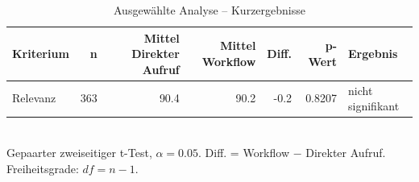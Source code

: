 \begin{table}[htbp]
\centering
\caption{Ausgewählte Analyse -- Kurzergebnisse}
\begin{tabular}{lrrrrrl}
\toprule
Kriterium & n & Mittel Direkter Aufruf & Mittel Workflow & Diff. & p-Wert & Ergebnis \\
\midrule
Relevanz & 363 & 90.4 & 90.2 & -0.2 & 0.8207 & nicht signifikant \\
\bottomrule
\end{tabular}
\\[2mm]
\footnotesize Gepaarter zweiseitiger t-Test, $\alpha=0.05$. Diff. = Workflow $-$ Direkter Aufruf. Freiheitsgrade: $df=n-1$.
\end{table}
